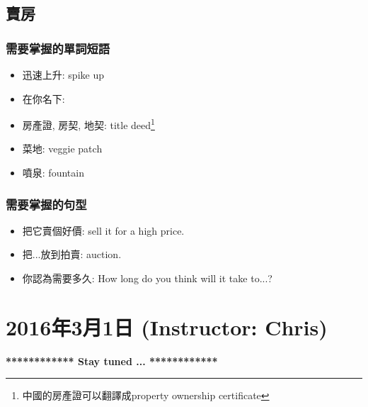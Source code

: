 \subsection{賣房}
\subsubsection*{需要掌握的單詞短語}
\begin{multicols}{2}
\begin{itemize}
  \itemsep0em
  \item 迅速上升: spike up
  \item 在你名下: 
  \item 房產證, 房契, 地契: title deed\footnote{中國的房產證可以翻譯成property ownership certificate}
  \item 菜地: veggie patch
  \item 噴泉: fountain
\end{itemize}
\end{multicols}

\subsubsection*{需要掌握的句型}
\begin{multicols}{2}
\begin{itemize}
  \itemsep0em
  \item 把它賣個好價: sell it for a high price.
  \item 把...放到拍賣:  auction.
  \item 你認為需要多久: How long do you think will it take to...?
\end{itemize}
\end{multicols}

\section{2016年3月1日 (Instructor: Chris)}

\vspace{15mm}
\begin{center}
  \textbf{************ Stay tuned ... ************}
\end{center}